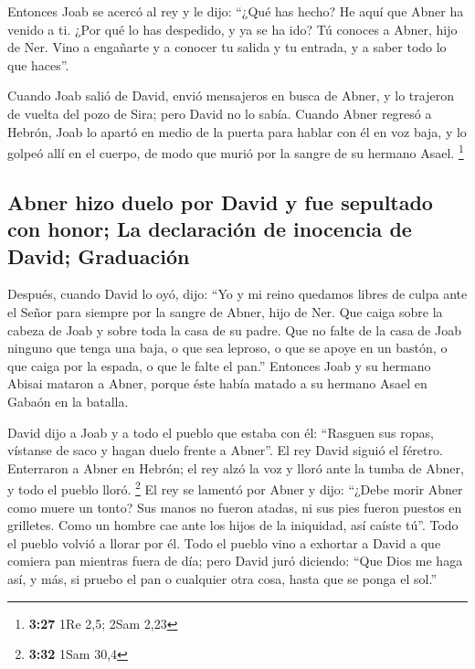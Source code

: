 \begin{paracol}{2}
 Entonces Joab se acercó al rey y le dijo: ``¿Qué has
hecho? He aquí que Abner ha venido a ti. ¿Por qué lo has despedido, y ya
se ha ido?  Tú conoces a Abner, hijo de Ner. Vino a
engañarte y a conocer tu salida y tu entrada, y a saber todo lo que
haces''.

 Cuando Joab salió de David, envió mensajeros en busca de
Abner, y lo trajeron de vuelta del pozo de Sira; pero David no lo sabía.
 Cuando Abner regresó a Hebrón, Joab lo apartó en medio
de la puerta para hablar con él en voz baja, y lo golpeó allí en el
cuerpo, de modo que murió por la sangre de su hermano Asael. \footnote{\textbf{3:27}
  1Re 2,5; 2Sam 2,23}

\hypertarget{abner-hizo-duelo-por-david-y-fue-sepultado-con-honor-la-declaraciuxf3n-de-inocencia-de-david-graduaciuxf3n}{%
\subsection{Abner hizo duelo por David y fue sepultado con honor; La
declaración de inocencia de David;
Graduación}\label{abner-hizo-duelo-por-david-y-fue-sepultado-con-honor-la-declaraciuxf3n-de-inocencia-de-david-graduaciuxf3n}}

 Después, cuando David lo oyó, dijo: ``Yo y mi reino
quedamos libres de culpa ante el Señor para siempre por la sangre de
Abner, hijo de Ner.  Que caiga sobre la cabeza de Joab y
sobre toda la casa de su padre. Que no falte de la casa de Joab ninguno
que tenga una baja, o que sea leproso, o que se apoye en un bastón, o
que caiga por la espada, o que le falte el pan.'' 
Entonces Joab y su hermano Abisai mataron a Abner, porque éste había
matado a su hermano Asael en Gabaón en la batalla.

 David dijo a Joab y a todo el pueblo que estaba con él:
``Rasguen sus ropas, vístanse de saco y hagan duelo frente a Abner''. El
rey David siguió el féretro.  Enterraron a Abner en
Hebrón; el rey alzó la voz y lloró ante la tumba de Abner, y todo el
pueblo lloró. \footnote{\textbf{3:32} 1Sam 30,4}  El rey
se lamentó por Abner y dijo: ``¿Debe morir Abner como muere un tonto?
 Sus manos no fueron atadas, ni sus pies fueron puestos
en grilletes. Como un hombre cae ante los hijos de la iniquidad, así
caíste tú''. Todo el pueblo volvió a llorar por él.  Todo
el pueblo vino a exhortar a David a que comiera pan mientras fuera de
día; pero David juró diciendo: ``Que Dios me haga así, y más, si pruebo
el pan o cualquier otra cosa, hasta que se ponga el sol.''


\end{paracol}
